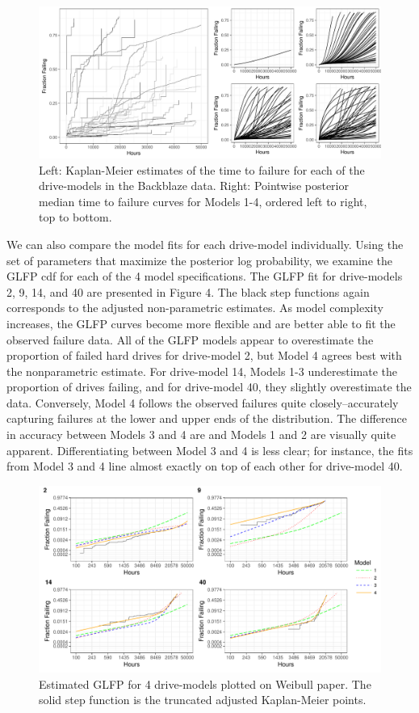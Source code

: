 \documentclass[12pt]{article}
\begin{document}
\begin{figure}[H]
\includegraphics[width=\textwidth]{fig/heterogeneity-compare-preliminary}
\caption{Left: Kaplan-Meier estimates of the time to failure for each of the drive-models in the Backblaze data. Right: Pointwise posterior median time to failure curves for Models 1-4, ordered left to right, top to bottom.}
\label{fig2}
\end{figure}

We can also compare the model fits for each drive-model individually.  Using the set of parameters that maximize the posterior log probability, we examine the GLFP cdf for each of the 4 model specifications.  The GLFP fit for drive-models 2, 9, 14, and 40 are presented in Figure 4.  The black step functions again corresponds to the adjusted non-parametric estimates.  As model complexity increases, the GLFP curves become more flexible and are better able to fit the observed failure data.  All of the GLFP models appear to overestimate the proportion of failed hard drives for drive-model 2, but Model 4 agrees best with the nonparametric estimate.  For drive-model 14, Models 1-3 underestimate the proportion of drives failing, and for drive-model 40, they slightly overestimate the data.  Conversely, Model 4 follows the observed failures quite closely--accurately capturing failures at the lower and upper ends of the distribution.  The difference in accuracy between Models 3 and 4 are and Models 1 and 2 are visually quite apparent.  Differentiating between Model 3 and 4 is less clear; for instance, the fits from Model 3 and 4 line almost exactly on top of each other for drive-model 40.
\begin{figure}[H]
    \centering
   \includegraphics[width=\textwidth]{fig/mod_compare_legend}
		\caption{Estimated GLFP for 4 drive-models plotted on Weibull paper.  The solid step function is the truncated adjusted Kaplan-Meier points.  \label{fig:first}} 
\end{figure}
\end{document}
